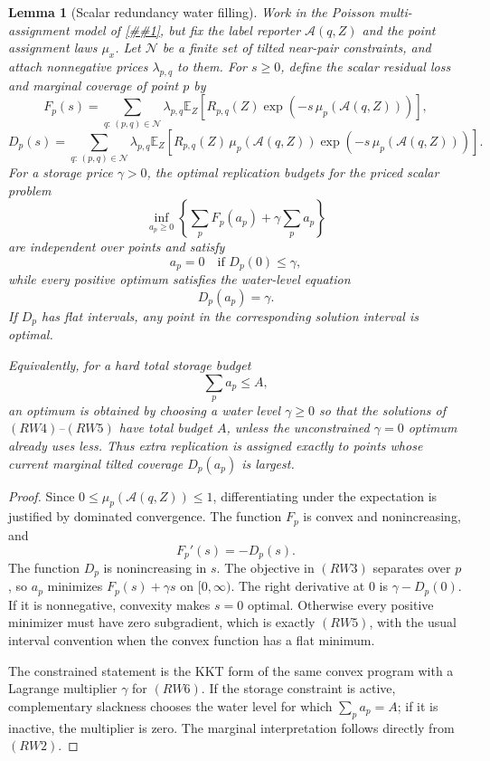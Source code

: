 \documentclass[10pt]{article}
\newcommand{\cref}[1]{\ref{##1}}
\newtheorem{lemma}[theorem]{Lemma}
\theoremstyle{definition}
\newcommand{\E}{\mathbb{E}}
\begin{document}
\begin{lemma}[Scalar redundancy water filling]
   \label{lem:scalar-redundancy-waterfill}
   Work in the Poisson multi-assignment model of
   \cref{lem:poisson-rate-coverage}, but fix the label reporter
   \(\mathcal A(q,Z)\) and the point assignment laws \(\mu_x\).  Let
   \(\mathcal N\) be a finite set of tilted near-pair constraints, and attach
   nonnegative prices \(\lambda_{p,q}\) to them.  For \(s\ge0\), define the
   scalar residual loss and marginal coverage of point \(p\) by
   \[
      F_p(s)
      =
      \sum_{q:\,(p,q)\in\mathcal N}
      \lambda_{p,q}
      \E_Z\!\left[
         R_{p,q}(Z)
         \exp\!\left(-s\,\mu_p(\mathcal A(q,Z))\right)
      \right],
      \tag{RW1}
   \]
   \[
      D_p(s)
      =
      \sum_{q:\,(p,q)\in\mathcal N}
      \lambda_{p,q}
      \E_Z\!\left[
         R_{p,q}(Z)\,
         \mu_p(\mathcal A(q,Z))
         \exp\!\left(-s\,\mu_p(\mathcal A(q,Z))\right)
      \right].
      \tag{RW2}
   \]
   For a storage price \(\gamma>0\), the optimal replication budgets for the
   priced scalar problem
   \[
      \inf_{a_p\ge0}
      \left\{
      \sum_p F_p(a_p)+\gamma\sum_pa_p
      \right\}
      \tag{RW3}
   \]
   are independent over points and satisfy
   \[
      a_p=0\quad\text{if }D_p(0)\le\gamma,
      \tag{RW4}
   \]
   while every positive optimum satisfies the water-level equation
   \[
      D_p(a_p)=\gamma .
      \tag{RW5}
   \]
   If \(D_p\) has flat intervals, any point in the corresponding solution
   interval is optimal.

   Equivalently, for a hard total storage budget
   \[
      \sum_pa_p\le A,
      \tag{RW6}
   \]
   an optimum is obtained by choosing a water level \(\gamma\ge0\) so that the
   solutions of \((RW4)\)--\((RW5)\) have total budget \(A\), unless the
   unconstrained \(\gamma=0\) optimum already uses less.  Thus extra
   replication is assigned exactly to points whose current marginal tilted
   coverage \(D_p(a_p)\) is largest.
\end{lemma}

\begin{proof}
   Since \(0\le\mu_p(\mathcal A(q,Z))\le1\), differentiating under the
   expectation is justified by dominated convergence.  The function \(F_p\) is
   convex and nonincreasing, and
   \[
      F_p'(s)=-D_p(s).
   \]
   The function \(D_p\) is nonincreasing in \(s\).  The objective in \((RW3)\)
   separates over \(p\), so \(a_p\) minimizes \(F_p(s)+\gamma s\) on
   \([0,\infty)\).  The right derivative at \(0\) is \(\gamma-D_p(0)\).  If it
   is nonnegative, convexity makes \(s=0\) optimal.  Otherwise every positive
   minimizer must have zero subgradient, which is exactly \((RW5)\), with the
   usual interval convention when the convex function has a flat minimum.

   The constrained statement is the KKT form of the same convex program with a
   Lagrange multiplier \(\gamma\) for \((RW6)\).  If the storage constraint is
   active, complementary slackness chooses the water level for which
   \(\sum_pa_p=A\); if it is inactive, the multiplier is zero.  The marginal
   interpretation follows directly from \((RW2)\).
\end{proof}
\end{document}
